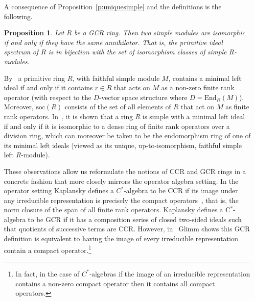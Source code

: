 \documentclass[11pt,reqno]{amsart}
\theoremstyle{plain}
\newtheorem{prop}[thm]{Proposition}
\numberwithin{equation}{section}
\begin{document}
A consequence of Proposition~\ref{p:uniquesimple} and the definitions is the following.

\begin{prop}\label{p:gcr.spectrum}
Let $R$ be a GCR ring.  Then two simple modules are isomorphic if and only if they have the same annihilator.  That is, the primitive ideal spectrum of $R$ is in bijection with the set of isomorphism classes of simple $R$-modules.
\end{prop}

By~\cite[Corollary~5.33]{Bre14} a primitive ring $R$, with faithful simple module $M$, contains a minimal left ideal if and only if it contains $r\in R$ that acts on $M$ as a non-zero finite rank operator (with respect to the $D$-vector space structure where $D=\mathrm{End}_R(M)$).  Moreover, $\mathrm{soc}(R)$ consists of the set of all elements of $R$ that act on $M$ as finite rank operators. In~\cite[Theorem~8.1]{CohnBA3}, it is shown that a ring $R$ is simple with a minimal left ideal if and only if it is isomorphic to a dense ring of finite rank operators over a division ring, which can moreover be taken to be the endomorphism ring of one of its minimal left ideals (viewed as its unique, up-to-isomorphism, faithful simple left $R$-module).

These observations allow us reformulate the notions of CCR and GCR rings in a concrete fashion that more closely mirrors the operator algebra setting. In the operator setting Kaplansky defines a $C^*$-algebra to be CCR if its image under any irreducible representation is precisely the compact operators~\cite{Ka51}, that is, the norm closure of the span of all finite rank operators. Kaplansky defines a C$^*$-algebra to be GCR if it has a composition series of closed two-sided ideals such that quotients of successive terms are CCR. However, in~\cite[Theorem 1]{Gl73} Glimm shows this GCR definition is equivalent to having the image of every irreducible representation contain a compact operator.\footnote{
	In fact, in the case of $C^*$-algebras if the image of an irreducible representation contains a non-zero compact operator then it contains all compact operators.}
\end{document}
